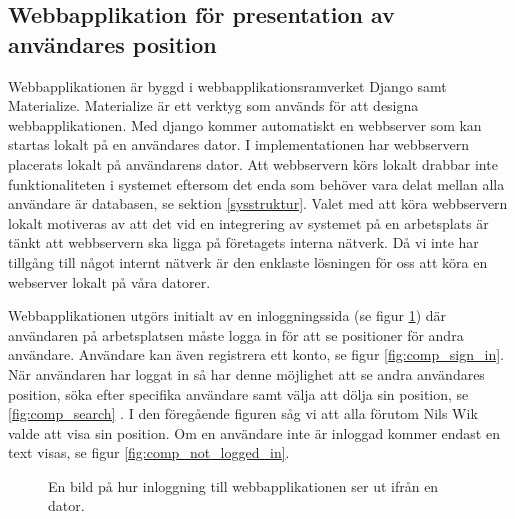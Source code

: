 \documentclass[a4paper,12pt]{article}
\begin{document}
 \subsection{Webbapplikation för presentation av användares position} \label{webbinterface}
 Webbapplikationen är byggd i webbapplikationsramverket Django samt Materialize. Materialize är ett verktyg som används för att designa webbapplikationen\cite{materialize}. Med django kommer automatiskt en webbserver som kan startas lokalt på en användares dator\cite{djangoMVC}. I implementationen har webbservern placerats lokalt på användarens dator. Att webbservern körs lokalt drabbar inte funktionaliteten i systemet eftersom det enda som behöver vara delat mellan alla användare är databasen, se sektion \ref{sysstruktur}. Valet med att köra webbservern lokalt motiveras av att det vid en integrering av systemet på en arbetsplats är tänkt att webbservern ska ligga på företagets interna nätverk. Då vi inte har tillgång till något internt nätverk är den enklaste lösningen för oss att köra en webserver lokalt på våra datorer.

 Webbapplikationen utgörs initialt av en inloggningssida (se figur \ref{fig:comp_log_in}) där användaren på arbetsplatsen måste logga in för att se positioner för andra användare. Användare kan även registrera ett konto, se figur \ref{fig:comp_sign_in}. När användaren har loggat in så har denne möjlighet att se andra användares position, söka efter specifika användare samt välja att dölja sin position, se \ref{fig:comp_search} . I den föregående figuren såg vi att alla förutom Nils Wik valde att visa sin position. Om en användare inte är inloggad kommer endast en text visas, se figur \ref{fig:comp_not_logged_in}.

 \begin{figure}[H]
   \centering
   \caption{En bild på hur inloggning till webbapplikationen ser ut ifrån en dator.}
   \label{fig:comp_log_in}
 \end{figure}
\end{document}
